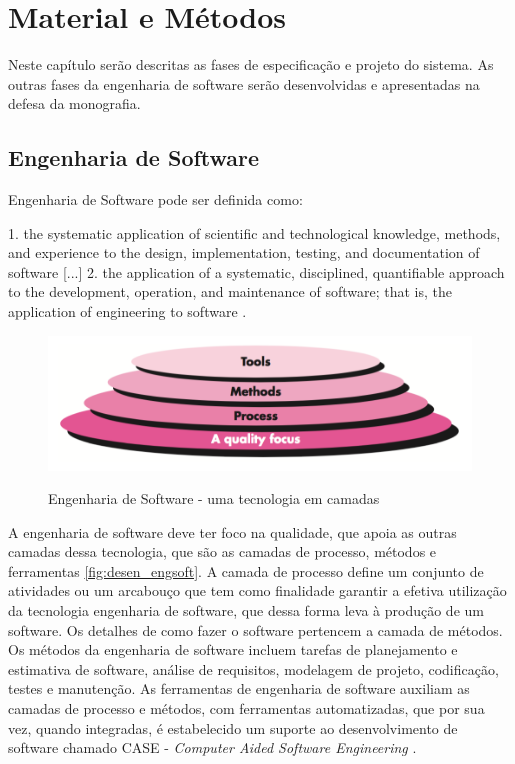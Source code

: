 \chapter{Material e Métodos}
Neste capítulo serão descritas as fases de especificação e projeto do sistema. As
outras fases da engenharia de software serão desenvolvidas e apresentadas na
defesa da monografia.

\section{Engenharia de Software}

Engenharia de Software pode ser definida como:
\begin{citacao}[english]
1. the systematic application of scientific and technological knowledge, methods, and experience to the design,
implementation, testing, and documentation of software [...]  2. the application
of a systematic, disciplined, quantifiable approach to the development, operation,
and maintenance of software; that is, the application of engineering to software \cite{IEEE2010}.
\end{citacao}

\begin{figure}[!b]
  \centering
  \caption{Engenharia de Software - uma tecnologia em camadas}
  \includegraphics[scale=0.33]{imagens/desenv_engsoft2}
  \label{fig:desen_engsoft}
\end{figure}

A engenharia de software deve ter foco na qualidade, que apoia as outras camadas
dessa tecnologia, que são as camadas de processo, métodos e ferramentas \autoref{fig:desen_engsoft}.
A camada de processo define um conjunto de atividades ou um arcabouço que tem
como finalidade garantir a efetiva utilização da tecnologia engenharia de software, que dessa forma
leva à produção de um software. Os detalhes de como fazer o software pertencem
a camada de métodos. Os métodos da engenharia de software incluem tarefas de planejamento
e estimativa de software, análise de requisitos, modelagem de projeto, codificação,
testes e manutenção. As ferramentas de engenharia de software auxiliam as camadas de
processo e métodos, com ferramentas automatizadas, que por sua vez, quando integradas,
é estabelecido um suporte ao desenvolvimento de software chamado CASE -
\textit{Computer Aided Software Engineering} \cite{Pressman2009, Sommerville2006}.

